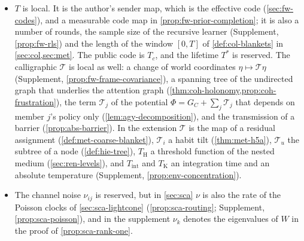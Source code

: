 \begin{itemize}
\item $T$ is local. It is the author's sender map, which is the effective code (\cref{sec:fw-codes}), and a measurable code map in \cref{prop:fw-prior-completion}; it is also a number of rounds, the sample size of the recursive learner (Supplement, \cref{prop:fw-rls}) and the length of the window $[0,T]$ of \cref{def:col-blankets} in \cref{sec:col,sec:met}. The public code is $T_c$, and the lifetime $T^\ast$ is reserved. The calligraphic $\mathcal T$ is local as well: a change of world coordinates $\eta\mapsto\mathcal T\eta$ (Supplement, \cref{prop:fw-frame-covariance}), a spanning tree of the undirected graph that underlies the attention graph (\cref{thm:coh-holonomy,prop:coh-frustration}), the term $\mathcal T_j$ of the potential $\Phi=G_C+\sum_j\mathcal T_j$ that depends on member $j$'s policy only (\cref{lem:agy-decomposition}), and the transmission of a barrier (\cref{prop:abs-barrier}). In the extension $\mathcal T$ is the map of a residual assignment (\cref{def:met-coarse-blanket}), $\mathcal T_i$ a habit tilt (\cref{thm:met-h5a}), $\mathcal T_u$ the subtree of a node (\cref{def:hie-tree}), $T_{\mathrm H}$ a threshold function of the nested medium (\cref{sec:ren-levels}), and $T_{\mathrm{int}}$ and $T_{\mathrm K}$ an integration time and an absolute temperature (Supplement, \cref{prop:env-concentration}).
\item The channel noise $\nu_{ij}$ is reserved, but in \cref{sec:sca} $\nu$ is also the rate of the Poisson clocks of \cref{sec:sca-lightcone} (\cref{prop:sca-routing}; Supplement, \cref{prop:sca-poisson}), and in the supplement $\nu_k$ denotes the eigenvalues of $W$ in the proof of \cref{prop:sca-rank-one}.

\end{itemize}
